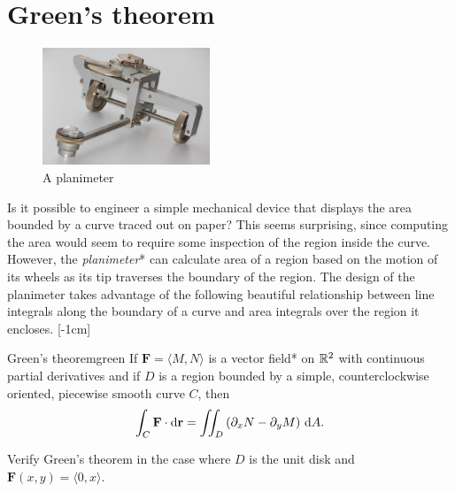 \documentclass[svgnames]{watsonbook}
\begin{document}
\section{Green's theorem} \label{sec:greens}


\begin{figure}
  \includegraphics[width=5cm]{figures/planimeter}
  \caption{A planimeter \label{fig:planimeter}}
\end{figure}

Is it possible to engineer a simple mechanical device that displays
the area bounded by a curve traced out on paper? This seems
surprising, since computing the area would seem to require some
inspection of the region inside the curve. However, the
\textit{planimeter}* can calculate area of a region based on the
motion of its wheels as its tip traverses the boundary of the region. The
design of the planimeter takes advantage of the following beautiful
relationship between line integrals along the boundary of a curve and
area integrals over the region it encloses. [-1cm]

\begin{theo}{Green's theorem}{green}
  If $\mathbf{F} = \langle M, N\rangle$ is a vector field* on $\mathbb{R}^2$
  with continuous partial derivatives and if $D$ is a region bounded by a
  simple, counterclockwise oriented, piecewise smooth curve $C$, then
  \[
    \int_C \mathbf{F} \cdot \mathrm{d}\mathbf{r} = \iint_D \left(\partial_x N -
      \partial_y M \right) \, {\mathrm{d}}A. 
  \]
\end{theo}

\begin{example}{}{}
  Verify Green's theorem in the case where $D$ is the unit disk and
  $\mathbf{F}(x,y)= \langle 0, x \rangle$. 
\end{example}
\end{document}

